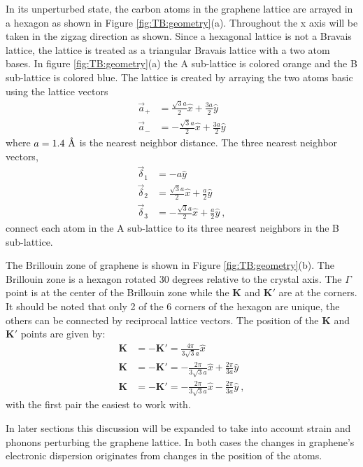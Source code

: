 In its unperturbed state, the carbon atoms in the graphene lattice are arrayed in a hexagon as shown in Figure \ref{fig:TB:geometry}(a).
Throughout the x axis will be taken in the zigzag direction as shown.
Since a hexagonal lattice is not a Bravais lattice, the lattice is treated as a triangular Bravais lattice with a two atom bases.
In figure \ref{fig:TB:geometry}(a) the A sub-lattice is colored orange and the B sub-lattice is colored blue.
The lattice is created by arraying the two atoms basic using the lattice vectors 
\begin{align*}
	\vec{a}_+&= \frac{\sqrt{3}a}{2} \hat{x} + \frac{3a}{2} \hat{y} \\
	\vec{a}_-&=-\frac{\sqrt{3}a}{2} \hat{x} + \frac{3a}{2} \hat{y}
\end{align*}
where $a=1.4 \ \textup{\AA}$ is the nearest neighbor distance.
The three nearest neighbor vectors,
\begin{align*}
	\vec \delta_1&=-a \hat{y} \\
	\vec \delta_2&= \frac{\sqrt{3} a}{2}\hat{x}+\frac{a}{2}\hat{y}\\
	\vec \delta_3&=-\frac{\sqrt{3} a}{2}\hat{x}+\frac{a}{2}\hat{y} \ ,
\end{align*}
connect each atom in the A sub-lattice to its three nearest neighbors in the B sub-lattice.

The Brillouin zone of graphene is shown in Figure \ref{fig:TB:geometry}(b).
The Brillouin zone is a hexagon rotated 30 degrees relative to the crystal axis.
The $\Gamma$ point is at the center of the Brillouin zone while the $\bm{K}$ and $\bm{K'}$ are at the corners.
It should be noted that only 2 of the 6 corners of the hexagon are unique, the others can be connected by reciprocal lattice vectors.
The position of the $\bm{K}$ and $\bm{K'}$ points are given by:
\begin{align*}
	\bm{K}&=-\bm{K'}= \frac{4 \pi}{3 \sqrt{3} a} \hat{x} \\
	\bm{K}&=-\bm{K'}=-\frac{2 \pi}{3 \sqrt{3} a} \hat{x} + \frac{2 \pi}{3 a} \hat{y} \\
	\bm{K}&=-\bm{K'}=-\frac{2 \pi}{3 \sqrt{3} a} \hat{x} - \frac{2 \pi}{3 a} \hat{y} \ ,
\end{align*}
with the first pair the easiest to work with.

In later sections this discussion will be expanded to take into account strain and phonons perturbing the graphene lattice.
In both cases the changes in graphene's electronic dispersion originates from changes in the position of the atoms.

